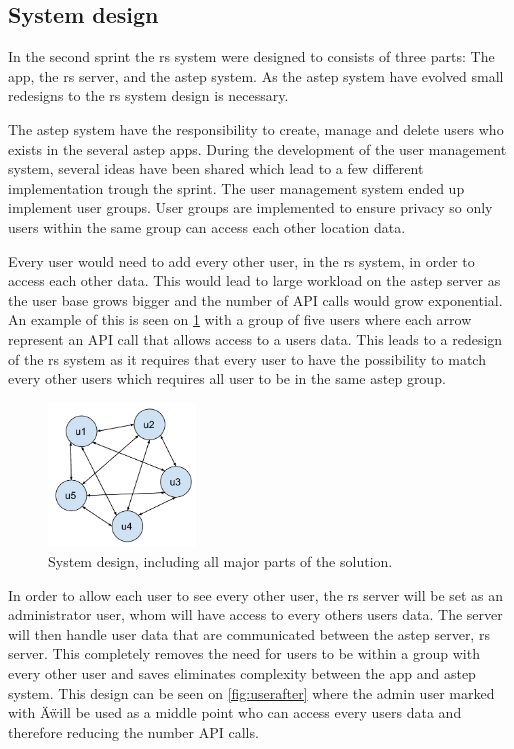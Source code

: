 \subsection{System design}
In the second sprint the \gls{rs} system were designed to consists of three parts: The app, the \gls{rs} server, and the \gls{astep} system.
As the \gls{astep} system have evolved small redesigns to the \gls{rs} system design is necessary.

The \gls{astep} system have the responsibility to create, manage and delete users who exists in the several \gls{astep} apps.
During the development of the user management system, several ideas have been shared which lead to a few different implementation trough the sprint.
The user management system ended up implement user groups.
User groups are implemented to ensure privacy so only users within the same group can access each other location data.

Every user would need to add every other user, in the \gls{rs} system, in order to access each other data.
This would lead to large workload on the \gls{astep} server as the user base grows bigger and the number of API calls would grow exponential.
An example of this is seen on \ref{fig:userbefore} with a group of five users where each arrow represent an API call that allows access to a users data.
This leads to a redesign of the \gls{rs} system as it requires that every user to have the possibility to match every other users which requires all user to be in the same \gls{astep} group.

\begin{figure}[!h]
	\centering
	\includegraphics[width=0.35\textwidth]{figures/userbefore.pdf}
	\caption{System design, including all major parts of the solution.}
	\label{fig:userbefore}
\end{figure}

In order to allow each user to see every other user, the \gls{rs} server will be set as an administrator user, whom will have access to every others users data.
The server will then handle user data that are communicated between the \gls{astep} server, \gls{rs} server. 
This completely removes the need for users to be within a group with every other user and saves eliminates complexity between the app and \gls{astep} system.
This design can be seen on \ref{fig:userafter} where the admin user marked with \"A\" will be used as a middle point who can access every users data and therefore reducing the number API calls.

